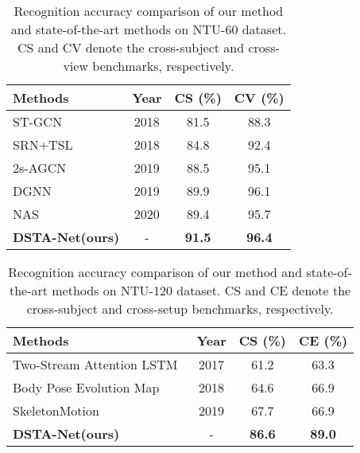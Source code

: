 \documentclass[runningheads]{llncs}
\begin{document}
\begin{table}[htb]
  \centering
  \caption{Recognition accuracy comparison of our method
and state-of-the-art methods on NTU-60 dataset. CS and CV denote the cross-subject and cross-view benchmarks, respectively. }
    \renewcommand\tabcolsep{5.0pt} \begin{tabular}{l|c|c|c}
		\hline
		Methods  & Year   &CS (\%)& CV (\%)    \\
        \hline
ST-GCN~\cite{yan_spatial_2018} & 2018 & 81.5  &      88.3  \\
        SRN+TSL~\cite{si_skeleton-based_2018} & 2018 & 84.8 & 92.4 \\
\hline
2s-AGCN~\cite{shi_two-stream_2019} & 2019  & 88.5  & 95.1\\
        DGNN~\cite{shi_skeleton-based_2019}  & 2019 & 89.9  & 96.1\\
        \hline
NAS~\cite{peng_learning_2020}  & 2020 & 89.4  & 95.7\\
		\hline
        \textbf{DSTA-Net(ours)} & - & \textbf{91.5} & \textbf{96.4} \\
		\hline
	\end{tabular}
  \label{tab:ntu-60}
\end{table}

\begin{table}[htb]
  \centering
    \caption{Recognition accuracy comparison of our method
and state-of-the-art methods on NTU-120 dataset. CS and CE denote the cross-subject and cross-setup benchmarks, respectively. }
    \renewcommand\tabcolsep{5.0pt} \begin{tabular}{l|c|c|c}
		\hline
		Methods  & Year   &CS (\%)& CE (\%)    \\
        \hline
Two-Stream Attention LSTM~\cite{liu_skeleton-based_2017} & 2017 & 61.2 &    63.3  \\
Body Pose Evolution Map~\cite{liu_recognizing_2018}  & 2018 & 64.6 &    66.9  \\
        SkeletonMotion~\cite{caetano_skelemotion:_2019}  & 2019 & 67.7 &    66.9  \\
        \hline
        \textbf{DSTA-Net(ours)} & - & \textbf{86.6} & \textbf{89.0} \\
		\hline
	\end{tabular}
  \label{tab:ntu-120}
\end{table}
\end{document}
